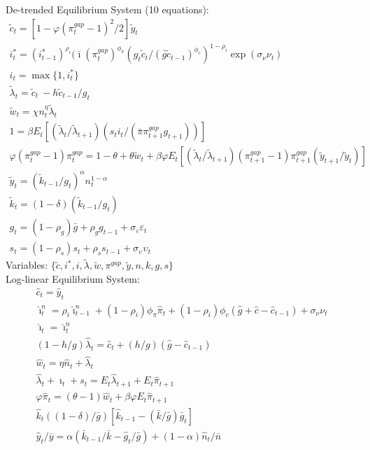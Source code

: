 \documentclass[12pt, final]{article}
\begin{document}
\setcounter{equation}{0}
\noindent De-trended Equilibrium System (10 equations):
\small\begin{gather}
\tilde{c}_t = [1-\varphi(\pi_t^{gap} - 1)^2/2]\tilde{y}_t\\
i_t^*=(i^*_{t-1})^{\rho_i}(\bar{\imath}(\pi_t^{gap})^{\phi_\pi}(g_t\tilde{c}_t/(\bar{g}\tilde{c}_{t-1})^{\phi_c})^{1-\rho_i}\exp(\sigma_\nu\nu_t)\\
i_t=\max\{1,i_t^*\}\\
\tilde{\lambda}_t = \tilde{c}_t\ - h\tilde{c}_{t-1}/g_t\\
\tilde{w}_t = \chi n_t^\eta \tilde{\lambda}_t  \\
  1 = \beta E_t[(\tilde{\lambda}_t/\tilde{\lambda}_{t+1})(s_ti_t/(\bar{\pi}\pi_{t+1}^{gap}g_{t+1}))]\\
  \varphi(\pi_t^{gap}-1){\pi}_t^{gap} = 1-\theta + \theta\tilde{w}_t + \beta\varphi E_t[(\tilde{\lambda}_t/\tilde{\lambda}_{t+1}) (\pi_{t+1}^{gap}-1)\pi_{t+1}^{gap}(\tilde{y}_{t+1}/\tilde{y}_t)]\\
  \tilde{y}_t= (\tilde{k}_{t-1}/g_t)^\alpha n_t^{1-\alpha}\\ %
\tilde{k}_t = (1-\delta)(\tilde{k}_{t-1}/g_t)\\%
  g_t= (1-\rho_g)\bar{g}+\rho_gg_{t-1} + \sigma_\varepsilon\varepsilon_t \\
  s_t=(1-\rho_s)s_t+\rho_ss_{t-1} + \sigma_\upsilon\upsilon_t
\end{gather}
Variables: $\{\tilde{c},i^*,i,\tilde{\lambda},\tilde{w},\pi^{gap},\tilde{y},n,k,g,s\}$\\ 

\setcounter{equation}{0}
\noindent Log-linear Equilibrium System:
\begin{gather}
  \hat{c}_t = \hat{y}_t\\
  \hat{\imath}_t^n = \rho_i\hat{\imath}^n_{t-1} + (1-\rho_i)\phi_\pi\hat{\pi}_t+ (1-\rho_i)\phi_c(\hat{g}+\hat{c}-\hat{c}_{t-1})+\sigma_\nu\nu_t \\
  \hat{\imath}_t = \hat{\imath}_t^n\\
  (1-h/g)\hat{\lambda}_t = \hat{c}_t + (h/g)(\hat{g} - \hat{c}_{t-1})\\
  \hat{w}_t =  \eta\hat{n}_t + \hat{\lambda}_t\\
  \hat{\lambda}_t + \hat{\imath}_t + s_t  = E_t\hat{\lambda}_{t+1}+E_t\hat{\pi}_{t+1} \\
  \varphi\hat{\pi}_t = (\theta-1)\hat{w}_t+\beta\varphi E_t\hat{\pi}_{t+1}\\
\hat{k}_t ((1-\delta)/\bar{g})[\hat{k}_{t-1} - (\bar{k}/\bar{g})\bar{g}_t]\\%
  \hat{y}_t/\bar{y} = \alpha(\bar{k}_{t-1}/\bar{k}-\hat{g}_t/\bar{g}) + (1-\alpha)\hat{n}_t/\bar{n} %
\end{gather}
\pagebreak
\end{document}

